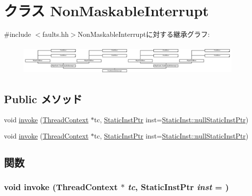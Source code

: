 \hypertarget{classMipsISA_1_1NonMaskableInterrupt}{
\section{クラス NonMaskableInterrupt}
\label{classMipsISA_1_1NonMaskableInterrupt}
}


{\ttfamily \#include $<$faults.hh$>$}NonMaskableInterruptに対する継承グラフ:\begin{figure}[H]
\begin{center}
\leavevmode
\includegraphics[height=1.56951cm]{classMipsISA_1_1NonMaskableInterrupt}
\end{center}
\end{figure}
\subsection*{Public メソッド}
\begin{DoxyCompactItemize}
\item 
void \hyperlink{classMipsISA_1_1NonMaskableInterrupt_a2bd783b42262278d41157d428e1f8d6f}{invoke} (\hyperlink{classThreadContext}{ThreadContext} $\ast$tc, \hyperlink{classRefCountingPtr}{StaticInstPtr} inst=\hyperlink{classStaticInst_aa793d9793af735f09096369fb17567b6}{StaticInst::nullStaticInstPtr})
\item 
void \hyperlink{classMipsISA_1_1NonMaskableInterrupt_a2bd783b42262278d41157d428e1f8d6f}{invoke} (\hyperlink{classThreadContext}{ThreadContext} $\ast$tc, \hyperlink{classRefCountingPtr}{StaticInstPtr} inst=\hyperlink{classStaticInst_aa793d9793af735f09096369fb17567b6}{StaticInst::nullStaticInstPtr})
\end{DoxyCompactItemize}


\subsection{関数}
\hypertarget{classMipsISA_1_1NonMaskableInterrupt_a2bd783b42262278d41157d428e1f8d6f}{
\subsubsection[{invoke}]{\setlength{\rightskip}{0pt plus 5cm}void invoke ({\bf ThreadContext} $\ast$ {\em tc}, \/  {\bf StaticInstPtr} {\em inst} = {})}}
\label{classMipsISA_1_1NonMaskableInterrupt_a2bd783b42262278d41157d428e1f8d6f}


